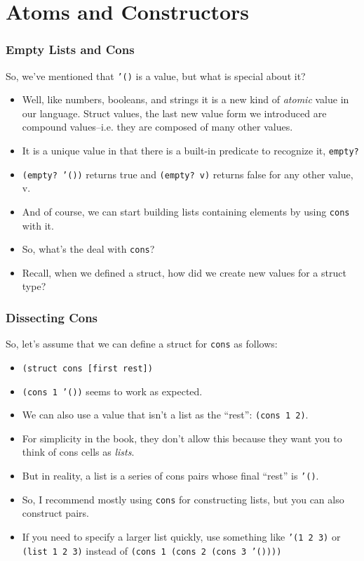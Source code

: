 \documentclass{beamer}
\begin{document}
\section{Atoms and Constructors}
\begin{frame}
  \frametitle{Empty Lists and Cons}
  So, we've mentioned that \texttt{'()} is a value, but what
  is special about it?
  \begin{itemize}
  \item<2-> Well, like numbers, booleans, and strings it is a new kind of \emph{atomic} value in our language.
    Struct values, the last new value form we introduced are compound values--i.e. they are composed
    of many other values.
  \item<3-> It is a unique value in that there is a built-in predicate to recognize it, \texttt{empty?}
  \item<4-> \texttt{(empty? '())} returns true and \texttt{(empty? v)} returns false for any other
    value, v.
  \item<5-> And of course, we can start building lists containing elements by using \texttt{cons} with it.
  \item<6-> So, what's the deal with \texttt{cons}?
  \item<7-> Recall, when we defined a struct, how did we create new values for a struct type?
  \end{itemize}
\end{frame}

\begin{frame}
  \frametitle{Dissecting Cons}
  So, let's assume that we can define a struct for \texttt{cons} as follows:
  \begin{itemize}
  \item<2-> \texttt{(struct cons [first rest])}
  \item<3-> \texttt{(cons 1 '())} seems to work as expected.
  \item<4-> We can also use a value that isn't a list as the ``rest'': \texttt{(cons 1 2)}.
  \item<5-> For simplicity in the book, they don't allow this because they want you to think of cons cells as \emph{lists}.
  \item<6-> But in reality, a list is a series of cons pairs whose final ``rest'' is \texttt{'()}.
  \item<7-> So, I recommend mostly using \texttt{cons} for constructing lists, but you can also construct pairs.
  \item<8-> If you need to specify a larger list quickly, use
    something like \texttt{'(1 2 3)} or \texttt{(list 1 2 3)} instead of \texttt{(cons 1 (cons 2 (cons 3 '())))}
  
  \end{itemize}
\end{frame}
\end{document}
